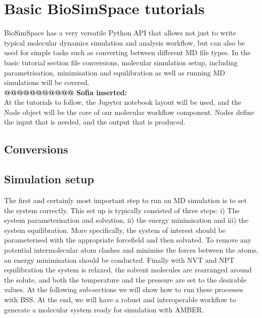 \documentclass[9pt,tutorial]{livecoms}
\begin{document}
\section{Basic BioSimSpace tutorials}
\label{sec:basic_tutorial}
BioSimSpace has a very versatile Python API that allows not just to write typical molecular dynamics simulation and analysis workflow, but can also be used for simple tasks such as converting between different MD file types. In the basic tutorial section file conversions, molecular simulation setup, including parametrisation, minimisation and equilibration as well as running MD simulations will be covered. \\

\textbf{@@@@@@@@@@@ Sofia inserted:} \\
At the tutorials to follow, the Jupyter notebook layout will be used, and the Node object will be the core of our molecular workflow component. Nodes define the input that is needed, and the output that is produced.

\subsection{Conversions}
\label{subsec:conversion}

\subsection{Simulation setup}
\label{subsec:setup}

The first and certainly most important step to run an MD simulation is to set the system correctly. This set up is typically consisted of three steps: i) The system parameterisation and solvation, ii) the energy minimisation and iii) the system equilibration. More specifically, the system of interest should be parameterised with the appropriate forcefield and then solvated. To remove any potential intermolecular atom clashes and minimise the forces between the atoms, an energy minimisation should be conducted. Finally with NVT and NPT equilibration the system is relaxed, the solvent molecules are rearranged around the solute, and both the temperature and the pressure are set to the desirable values. At the following sub-sections we will show how to run these processes with BSS. At the end, we will have a robust and interoperable workflow to generate a molecular system ready for simulation with AMBER.
\end{document}

